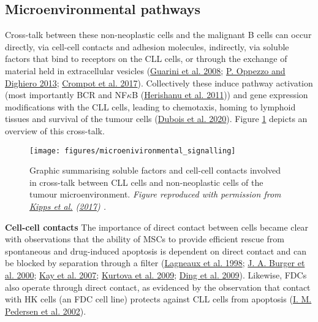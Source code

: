 \documentclass[11pt, a4paper, twosided]{book}
\begin{document}
\hypertarget{intro-microenvironmental-pathways}{%
\subsection{Microenvironmental pathways}\label{intro-microenvironmental-pathways}}

Cross-talk between these non-neoplastic cells and the malignant B cells can occur directly, via cell-cell contacts and adhesion molecules, indirectly, via soluble factors that bind to receptors on the CLL cells, or through the exchange of material held in extracellular vesicles (\protect\hyperlink{ref-Guarini2008}{Guarini et al. 2008}; \protect\hyperlink{ref-Oppezzo2013}{P. Oppezzo and Dighiero 2013}; \protect\hyperlink{ref-Crompot2017}{Crompot et al. 2017}). Collectively these induce pathway activation (most importantly BCR and NF\(\kappa\)B (\protect\hyperlink{ref-Herishanu2011}{Herishanu et al. 2011})) and gene expression modifications with the CLL cells, leading to chemotaxis, homing to lymphoid tissues and survival of the tumour cells (\protect\hyperlink{ref-Dubois2020}{Dubois et al. 2020}). Figure \ref{fig:microenvironmentSignalling} depicts an overview of this cross-talk.


\begin{figure}

{\centering \texttt{[image: figures/microenivironmental\_signalling]} 

}

\caption{Graphic summarising soluble factors and cell-cell contacts involved in cross-talk between CLL cells and non-neoplastic cells of the tumour microenvironment. \emph{Figure reproduced with permission from \protect\hyperlink{ref-Kipps2017}{Kipps et al.} (\protect\hyperlink{ref-Kipps2017}{2017}) .}}\label{fig:microenvironmentSignalling}
\end{figure}
\textbf{Cell-cell contacts}
The importance of direct contact between cells became clear with observations that the ability of MSCs to provide efficient rescue from spontaneous and drug-induced apoptosis is dependent on direct contact and can be blocked by separation through a filter (\protect\hyperlink{ref-Lagneaux1998}{Lagneaux et al. 1998}; \protect\hyperlink{ref-Burger2000}{J. A. Burger et al. 2000}; \protect\hyperlink{ref-Kay2007}{Kay et al. 2007}; \protect\hyperlink{ref-Kurtova2009}{Kurtova et al. 2009}; \protect\hyperlink{ref-Ding2009}{Ding et al. 2009}). Likewise, FDCs also operate through direct contact, as evidenced by the observation that contact with HK cells (an FDC cell line) protects against CLL cells from apoptosis (\protect\hyperlink{ref-Pedersen2002}{I. M. Pedersen et al. 2002}).
\end{document}
